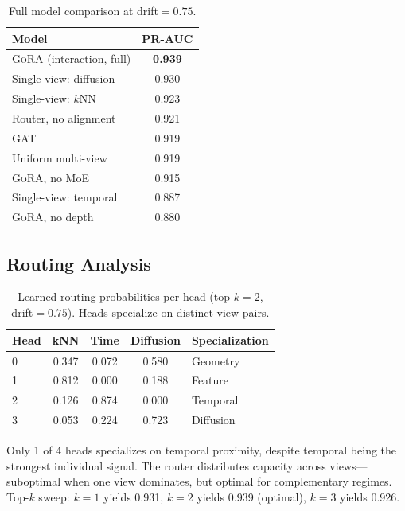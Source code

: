 \documentclass[11pt,a4paper]{article}
\newcommand{\ours}{\textsc{GoRA}}  %
\begin{document}
\begin{table}[t]
\centering
\caption{Full model comparison at drift${}=0.75$.}
\label{tab:baselines}
\begin{tabular}{@{}lc@{}}
\toprule
Model & PR-AUC \\
\midrule
\ours{} (interaction, full) & \textbf{0.939} \\
Single-view: diffusion & 0.930 \\
Single-view: $k$NN & 0.923 \\
Router, no alignment & 0.921 \\
GAT \citep{velickovic2018graph} & 0.919 \\
Uniform multi-view & 0.919 \\
\ours{}, no MoE & 0.915 \\
Single-view: temporal & 0.887 \\
\ours{}, no depth & 0.880 \\
\bottomrule
\end{tabular}
\end{table}

\subsection{Routing Analysis}
\label{sec:routing_analysis}

\begin{table}[t]
\centering
\caption{Learned routing probabilities per head (top-$k=2$,
drift${}=0.75$). Heads specialize on distinct view pairs.}
\label{tab:routing}
\begin{tabular}{@{}lcccl@{}}
\toprule
Head & kNN & Time & Diffusion & Specialization \\
\midrule
0 & 0.347 & 0.072 & 0.580 & Geometry \\
1 & 0.812 & 0.000 & 0.188 & Feature \\
2 & 0.126 & 0.874 & 0.000 & Temporal \\
3 & 0.053 & 0.224 & 0.723 & Diffusion \\
\bottomrule
\end{tabular}
\end{table}

Only 1 of 4 heads specializes on temporal proximity, despite temporal
being the strongest individual signal.
The router distributes capacity across views---suboptimal when one view
dominates, but optimal for complementary regimes.
Top-$k$ sweep: $k=1$ yields 0.931, $k=2$ yields 0.939 (optimal),
$k=3$ yields 0.926.
\end{document}
